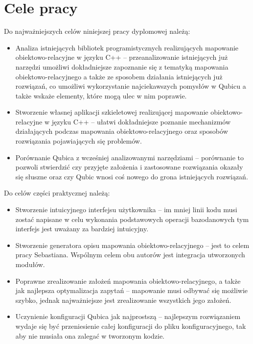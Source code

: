 \documentclass[12pt]{report}
\begin{document}
\section{Cele pracy}

Do najważniejszych celów niniejszej pracy dyplomowej należą:

\begin{itemize}
\item Analiza istniejących bibliotek programistycznych realizujących ma\-po\-wa\-nie obiektowo-relacyjne w języku C++ -- przeanalizowanie istniejących już na\-rzędzi
umożliwi dokładniejsze zapoznanie się z tematyką mapowania obiekt\-owo-relacyjnego a także ze sposobem działania istniejących już rozwiązań, co umożliwi wykorzystanie 
najciekawszych pomysłów w Qubicu a także wskaże elementy, które mogą ulec w nim poprawie.
\item Stworzenie własnej aplikacji szkieletowej realizującej mapowanie obiektowo-relacyjne w języku C++ -- ułatwi dokładniejsze poznanie mechanizmów dzia\-łających
podczas mapowania obiektowo-relacyjnego oraz sposobów ro\-zwią\-zania pojawiających się problemów.
\item Porównanie Qubica z wcześniej analizowanymi narzędziami -- porównanie to pozwoli stwierdzić czy przyjęte założenia i zastosowane rozwiązania okazały się słuszne
oraz czy Qubic wnosi coś nowego do grona istniejących rozwiązań.
\end{itemize}

\newpage

Do celów części praktycznej należą:

\begin{itemize}
\item Stworzenie intuicyjnego interfejsu użytkownika -- im mniej linii kodu musi zostać napisane w celu wykonania podstawowych operacji bazodanowych tym interfejs jest 
uważany za bardziej intuicyjny.
\item Stworzenie generatora opisu mapowania obiektowo-relacyjnego -- jest to celem pracy Sebastiana. Wspólnym celem obu autorów jest integracja utworzonych  modułów.
\item Poprawne zrealizowanie założeń mapowania obiektowo-relacyjnego, a także jak najlepsza optymalizacja zapytań -- mapowanie musi odbywać się możliwie szybko, jednak
najważniejsze jest zrealizowanie wszystkich jego założeń.
\item Uczynienie konfiguracji Qubica jak najprostszą -- najlepszym rozwiązaniem wydaje się być przeniesienie całej konfiguracji do pliku konfiguracyjnego, tak aby nie musiała
ona zalegać w tworzonym kodzie.
\end{itemize}
\end{document}
